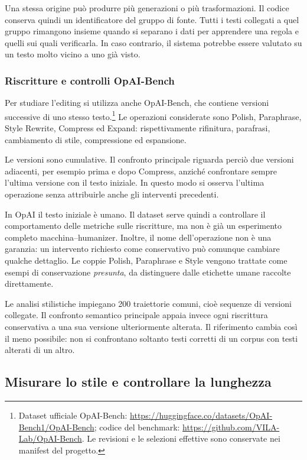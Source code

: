 \documentclass[11pt,a4paper]{article}
\begin{document}
Una stessa origine può produrre più generazioni o più trasformazioni. Il codice conserva quindi un identificatore del gruppo di fonte. Tutti i testi collegati a quel gruppo rimangono insieme quando si separano i dati per apprendere una regola e quelli sui quali verificarla. In caso contrario, il sistema potrebbe essere valutato su un testo molto vicino a uno già visto.

\subsubsection{Riscritture e controlli OpAI-Bench}\label{riscritture-e-controlli-opai-bench}

Per studiare l'editing si utilizza anche OpAI-Bench, che contiene versioni successive di uno stesso testo.\footnote{Dataset ufficiale OpAI-Bench: \url{https://huggingface.co/datasets/OpAI-Bench1/OpAI-Bench}; codice del benchmark: \url{https://github.com/VILA-Lab/OpAI-Bench}. Le revisioni e le selezioni effettive sono conservate nei manifest del progetto.} Le operazioni considerate sono Polish, Paraphrase, Style Rewrite, Compress ed Expand: rispettivamente rifinitura, parafrasi, cambiamento di stile, compressione ed espansione.

Le versioni sono cumulative. Il confronto principale riguarda perciò due versioni adiacenti, per esempio prima e dopo Compress, anziché confrontare sempre l'ultima versione con il testo iniziale. In questo modo si osserva l'ultima operazione senza attribuirle anche gli interventi precedenti.

In OpAI il testo iniziale è umano. Il dataset serve quindi a controllare il comportamento delle metriche sulle riscritture, ma non è già un esperimento completo macchina--humanizer. Inoltre, il nome dell'operazione non è una garanzia: un intervento richiesto come conservativo può comunque cambiare qualche dettaglio. Le coppie Polish, Paraphrase e Style vengono trattate come esempi di conservazione \emph{presunta}, da distinguere dalle etichette umane raccolte direttamente.

Le analisi stilistiche impiegano 200 traiettorie comuni, cioè sequenze di versioni collegate. Il confronto semantico principale appaia invece ogni riscrittura conservativa a una sua versione ulteriormente alterata. Il riferimento cambia così il meno possibile: non si confrontano soltanto testi corretti di un corpus con testi alterati di un altro.

\subsection{Misurare lo stile e controllare la lunghezza}\label{misurare-lo-stile-e-controllare-la-lunghezza}
\end{document}
